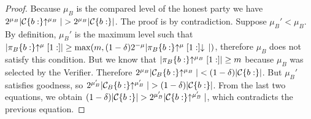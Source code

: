 \begin{proof}
    Because $\mu_B$ is the compared level of the honest party we have
    $2^{\mu_B}|\mathcal{C}\{b:\}\negthickspace\uparrow^{\mu_B}| > 2^{\mu_B}|\mathcal{C}\{b:\}|$.
    The proof is by contradiction. Suppose $\mu_B' < \mu_B$.
    By definition, $\mu_B'$ is the maximum level such that
    $|\pi_B\{b:\}\negthickspace\uparrow^\mu[1:]| \geq \max(m, (1 -
    \delta)2^{-\mu}|\pi_B\{b:\}\negthickspace\uparrow^\mu[1:]\negthickspace\downarrow\,|)$, therefore
    $\mu_B$ does not satisfy this condition. But we know that
    $|\pi_B\{b:\}\negthickspace\uparrow^{\mu_B}[1:]| \geq m$ because $\mu_B$ was selected by
    the Verifier. Therefore
    $2^{\mu_B}|\mathcal{C}_B\{b:\}\negthickspace\uparrow^{\mu_B}| < (1 - \delta)|\mathcal{C}\{b:\}|$.
    But $\mu_B'$ satisfies goodness, so
    $2^{\mu_B'}|\mathcal{C}_B\{b:\}\negthickspace\uparrow^{\mu_B'}| > (1 - \delta)|\mathcal{C}\{b:\}|$.
    From the last two equations, we obtain
    $(1 - \delta)|\mathcal{C}\{b:\}| > 2^{\mu_B'}|\mathcal{C}\{b:\}\negthickspace\uparrow^{\mu_B'}|$,
    which contradicts the previous equation.
    \Qed
\end{proof}
